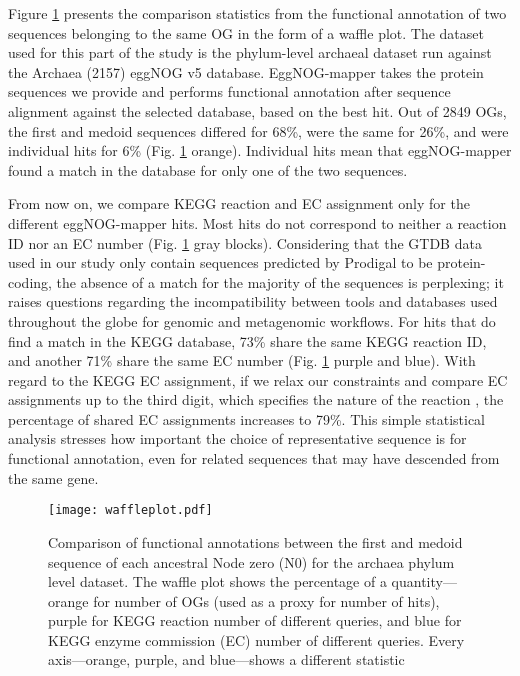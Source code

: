 Figure \ref{waffleplot} presents the comparison statistics from the functional annotation of two sequences belonging to the same OG in the form of a waffle plot. The dataset used for this part of the study is the phylum-level archaeal dataset run against the Archaea (2157) eggNOG v5 database. EggNOG-mapper takes the protein sequences we provide and performs functional annotation after sequence alignment against the selected database, based on the best hit. Out of 2849 OGs, the first and medoid sequences differed for 68\%, were the same for 26\%, and were individual hits for 6\% (Fig. \ref{waffleplot} orange). Individual hits mean that eggNOG-mapper found a match in the database for only one of the two sequences.

From now on, we compare KEGG reaction and EC assignment only for the different eggNOG-mapper hits. Most hits do not correspond to neither a reaction ID nor an EC number (Fig. \ref{waffleplot} gray blocks). Considering that the GTDB data used in our study only contain sequences predicted by Prodigal to be protein-coding, the absence of a match for the majority of the sequences is perplexing; it raises questions regarding the incompatibility between tools and databases used throughout the globe for genomic and metagenomic workflows. For hits that do find a match in the KEGG database, 73\% share the same KEGG reaction ID, and another 71\% share the same EC number (Fig. \ref{waffleplot} purple and blue). With regard to the KEGG EC assignment, if we relax our constraints and compare EC assignments up to the third digit, which specifies the nature of the reaction \cite{mcdonald2009}, the percentage of shared EC assignments increases to 79\%. This simple statistical analysis stresses how important the choice of representative sequence is for functional annotation, even for related sequences that may have descended from the same gene. 



\begin{figure}[H]
    \centering
    \texttt{[image: waffleplot.pdf]}
    \caption{Comparison of functional annotations between the first and medoid sequence of each ancestral Node zero (N0) for the archaea phylum level dataset. The waffle plot shows the percentage of a quantity---orange for number of OGs (used as a proxy for number of hits), purple for KEGG reaction number of different queries, and blue for KEGG enzyme commission (EC) number of different queries.  
    Every axis---orange, purple, and blue---shows a different statistic}
    \label{waffleplot}
\end{figure}  


